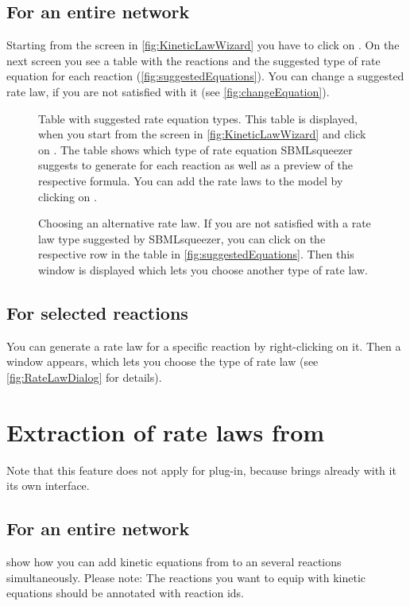 \subsection{For an entire network}
Starting from the screen in \vref{fig:KineticLawWizard} you have to click on . On the next screen you see a table with the reactions and the suggested type of rate equation for each reaction (\vref{fig:suggestedEquations}). You can change a suggested rate law, if you are not satisfied with it (see \vref{fig:changeEquation}).

\begin{figure}[htbp]
\caption{Table with suggested rate equation types.
This table is displayed, when you start from the screen in \vref{fig:KineticLawWizard} and click on . The table shows which type of rate equation SBMLsqueezer suggests to generate for each reaction as well as a preview of the respective formula. You can add the rate laws to the model by clicking on .}
\label{fig:suggestedEquations}
\end{figure}

\begin{figure}
\caption{Choosing an alternative rate law.
If you are not satisfied with a rate law type suggested by SBMLsqueezer, you can click on the respective row in the table in \vref{fig:suggestedEquations}. Then this window is displayed which lets you choose another type of rate law.}
\label{fig:changeEquation}
\end{figure}

\subsection{For selected reactions}
You can generate a rate law for a specific reaction by right-clicking on it. Then a window appears, which lets you choose the type of rate law (see \vref{fig:RateLawDialog} for details).


\section{Extraction of rate laws from \SABIO}

Note that this feature does not apply for \CellDesigner plug-in,
because \CellDesigner brings already with it its own \SABIO interface.

\subsection{For an entire network}
 show how you can add kinetic equations from \SABIO to an several reactions simultaneously. Please note: The reactions you want to equip with kinetic equations should be annotated with \KEGG reaction ids.

